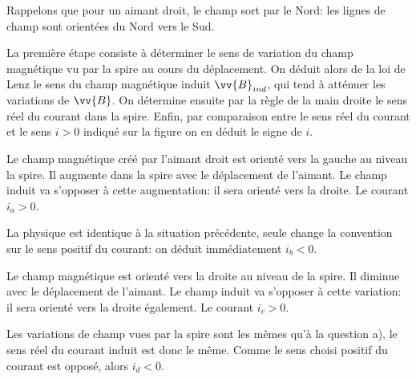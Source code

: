 
\begin{enonce}
\end{enonce}
\begin{corrige}
Rappelons que pour un aimant droit, le champ sort par le Nord: les
lignes de champ sont orientées du Nord vers le Sud.

La première étape consiste à  déterminer le sens de variation du champ magnétique vu par la spire au cours du déplacement. On déduit alors de la loi de Lenz le sens du champ magnétique induit $\vv{B}_{ind}$, qui tend à  atténuer les variations de $\vv{B}$. On détermine ensuite par la règle de la main droite le sens réel du courant dans la spire. Enfin, par comparaison entre le sens réel du courant et le sens $i>0$ indiqué sur la figure on en déduit le signe de $i$.

Le champ magnétique créé par l'aimant droit est orienté vers la gauche  au niveau la spire. Il augmente dans la spire avec le déplacement de l'aimant. Le champ induit va s'opposer à cette augmentation: il sera orienté vers la droite.
Le courant $i_a >0$.
\end{corrige}

\begin{enonce}
\end{enonce}
\begin{corrige}
La physique est identique à la situation précédente, seule change la convention sur le sens positif du courant: on
déduit immédiatement $i_b< 0$.
\end{corrige}

\begin{enonce}
\end{enonce}
\begin{corrige}
Le champ magnétique est orienté vers la droite au niveau de la spire. Il diminue avec le déplacement de l'aimant. Le champ induit va s'opposer à cette variation: il sera orienté vers la droite également.
Le courant $i_c >0$.
\end{corrige}

\begin{enonce}
\end{enonce}
\begin{corrige}
Les variations de champ vues par la spire sont les mêmes qu'à la question a), le sens réel du courant induit est donc
le même.  Comme le sens choisi positif du courant est opposé, alors $i_d < 0$.
\end{corrige}

